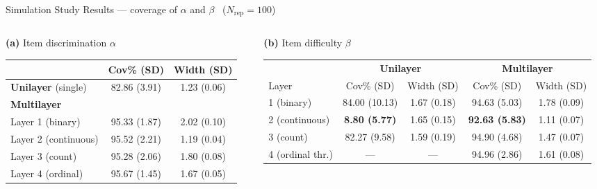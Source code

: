 \documentclass{beamer}
\begin{document}
\begin{frame}{Simulation Study}
{Results --- coverage of $\alpha$ and $\beta$ \ ($N_{\mathrm{rep}}=100$)}

\begin{columns}[T]
\begin{column}{0.48\textwidth}
\centering
\textbf{(a)} Item discrimination $\alpha$\\[2pt]
{\scriptsize
\setlength{\tabcolsep}{3pt}
\renewcommand{\arraystretch}{1.05}
\begin{tabular}{l cc}
\toprule
 & Cov\% (SD) & Width (SD) \\
\midrule
\textbf{Unilayer} (single)      & 82.86 (3.91) & 1.23 (0.06) \\
\midrule
\textbf{Multilayer}             &              &              \\
\;Layer 1 (binary)              & 95.33 (1.87) & 2.02 (0.10) \\
\;Layer 2 (continuous)          & 95.52 (2.21) & 1.19 (0.04) \\
\;Layer 3 (count)               & 95.28 (2.06) & 1.80 (0.08) \\
\;Layer 4 (ordinal)             & 95.67 (1.45) & 1.67 (0.05) \\
\bottomrule
\end{tabular}
}
\end{column}

\begin{column}{0.52\textwidth}
\centering
\textbf{(b)} Item difficulty $\beta$\\[2pt]
{\scriptsize
\setlength{\tabcolsep}{3pt}
\renewcommand{\arraystretch}{1.05}
\begin{tabular}{l cc cc}
\toprule
 & \multicolumn{2}{c}{\textbf{Unilayer}} & \multicolumn{2}{c}{\textbf{Multilayer}} \\
\cmidrule(lr){2-3}\cmidrule(lr){4-5}
Layer & Cov\% (SD) & Width (SD) & Cov\% (SD) & Width (SD) \\
\midrule
1 (binary)        & 84.00 (10.13)             & 1.67 (0.18) & 94.63 (5.03)         & 1.78 (0.09) \\
2 (continuous)    & \textbf{\phantom{0}8.80 (5.77)} & 1.65 (0.15) & \textbf{92.63 (5.83)} & 1.11 (0.07) \\
3 (count)         & 82.27 (9.58)              & 1.59 (0.19) & 94.90 (4.68)         & 1.47 (0.07) \\
4 (ordinal thr.)  & ---                       & ---         & 94.96 (2.86)         & 1.61 (0.08) \\
\bottomrule
\end{tabular}
}
\end{column}
\end{columns}


\end{frame}
\end{document}
